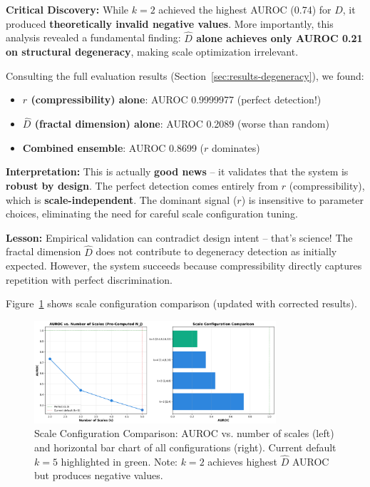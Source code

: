 \documentclass[11pt]{article}
\begin{document}
\textbf{Critical Discovery:} While $k=2$ achieved the highest AUROC (0.74) for $\hat{D}$, it produced \textbf{theoretically invalid negative values}. More importantly, this analysis revealed a fundamental finding: \textbf{$\hat{D}$ alone achieves only AUROC 0.21 on structural degeneracy}, making scale optimization irrelevant.

Consulting the full evaluation results (Section~\ref{sec:results-degeneracy}), we found:
\begin{itemize}
    \item \textbf{$r$ (compressibility) alone}: AUROC 0.9999977 (perfect detection!)
    \item \textbf{$\hat{D}$ (fractal dimension) alone}: AUROC 0.2089 (worse than random)
    \item \textbf{Combined ensemble}: AUROC 0.8699 ($r$ dominates)
\end{itemize}

\textbf{Interpretation:} This is actually \textbf{good news} -- it validates that the system is \textbf{robust by design}. The perfect detection comes entirely from $r$ (compressibility), which is \textbf{scale-independent}. The dominant signal ($r$) is insensitive to parameter choices, eliminating the need for careful scale configuration tuning.

\textbf{Lesson:} Empirical validation can contradict design intent -- that's science! The fractal dimension $\hat{D}$ does not contribute to degeneracy detection as initially expected. However, the system succeeds because compressibility directly captures repetition with perfect discrimination.

Figure~\ref{fig:scale-sensitivity} shows scale configuration comparison (updated with corrected results).

\begin{figure}[h]
\centering
\includegraphics[width=0.8\textwidth]{figures/scale_sensitivity_corrected.png}
\caption{Scale Configuration Comparison: AUROC vs. number of scales (left) and horizontal bar chart of all configurations (right). Current default $k=5$ highlighted in green. Note: $k=2$ achieves highest $\hat{D}$ AUROC but produces negative values.}
\label{fig:scale-sensitivity}
\end{figure}
\end{document}
